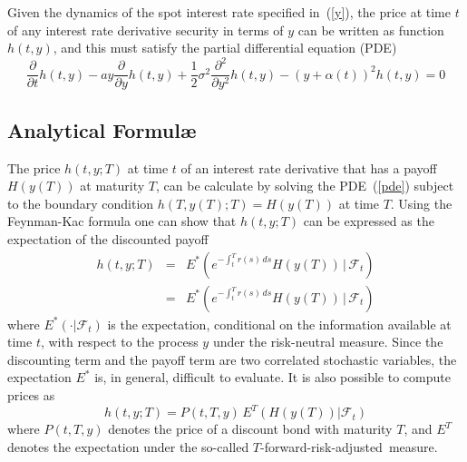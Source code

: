 Given the dynamics of the spot interest rate specified in~(\ref{y}), the price at time $t$ of any interest rate derivative security in terms of $y$ can be written as function $h(t,y)$, and this must satisfy the partial differential equation (PDE)
\begin{equation}
\label{pde}
\frac{\partial}{\partial t}h(t,y) - ay\frac{\partial}{\partial y}h(t,y) + \frac{1}{2}\sigma^2\frac{\partial^2}{\partial y^2}h(t,y)
- {\left( y+\alpha(t)\right)}^2 h(t,y) = 0
\end{equation}


\subsection{Analytical Formul\ae}
The price $h(t,y; T)$ at time $t$ of an interest rate derivative that has a payoff $H\left(y(T)\right)$ at maturity $T$, can be calculate by solving the PDE~(\ref{pde}) subject to the boundary condition $h\left(T,y(T); T\right) = H\left(y(T)\right)$ at time $T$. Using the Feynman-Kac formula one can show that $h(t,y; T)$ can be expressed as the expectation of the discounted payoff
\begin{eqnarray}
h(t,y; T) & = & \displaystyle E^* \left( e^{\displaystyle{-\int_{t}^{T} r(s) \, ds}} H\left(y(T)\right) \, \Bigg| \, \mathcal{F}_t \right) \nonumber \\
          & = & \displaystyle E^* \left( e^{\displaystyle{-\int_{t}^{T} r(s) \, ds}} H\left(y(T)\right) \, \Bigg| \, \mathcal{F}_t \right)
\end{eqnarray}
where $E^*(\cdot | \mathcal{F}_t)$ is the expectation, conditional on the information available at time $t$, with respect to the process $y$ under the risk-neutral measure. Since the discounting term and the payoff term are two correlated stochastic variables, the expectation $E^*$ is, in general, difficult to evaluate. It is also possible to compute prices as
\begin{equation}
h(t,y; T) = P(t,T,y)\, E^T\left(H(y(T))|\mathcal{F}_t \right)
\end{equation}
where $P(t,T,y)$ denotes the price of a discount bond with maturity $T$, and $E^T$ denotes the expectation under the so-called $T$-forward-risk-adjusted~measure.


